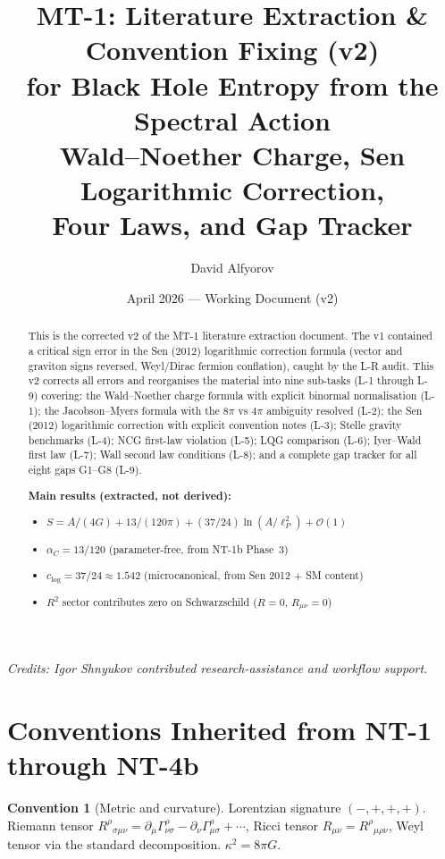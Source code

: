 \documentclass[12pt,a4paper]{article}
\title{\textbf{MT-1: Literature Extraction \& Convention Fixing (v2)\\[4pt]
       for Black Hole Entropy from the Spectral Action}\\[8pt]
       \large Wald--Noether Charge, Sen Logarithmic Correction,\\
       Four Laws, and Gap Tracker}
\author{David Alfyorov}
\date{April 2026 --- Working Document (v2)}
\theoremstyle{definition}
\newtheorem{convention}[proposition]{Convention}
\theoremstyle{remark}
\begin{document}
\maketitle

\begin{center}
\small\textit{Credits: Igor Shnyukov contributed research-assistance
and workflow support.}
\end{center}

\begin{abstract}
This is the corrected v2 of the MT-1 literature extraction document.
The v1 contained a critical sign error in the Sen (2012) logarithmic
correction formula (vector and graviton signs reversed, Weyl/Dirac
fermion conflation), caught by the L-R audit.  This v2 corrects all
errors and reorganises the material into nine sub-tasks (L-1 through
L-9) covering: the Wald--Noether charge formula with explicit binormal
normalisation (L-1); the Jacobson--Myers formula with the $8\pi$ vs
$4\pi$ ambiguity resolved (L-2); the Sen (2012) logarithmic correction
with explicit convention notes (L-3); Stelle gravity benchmarks (L-4);
NCG first-law violation (L-5); LQG comparison (L-6); Iyer--Wald first
law (L-7); Wall second law conditions (L-8); and a complete gap tracker
for all eight gaps G1--G8 (L-9).

\medskip\noindent
\textbf{Main results (extracted, not derived):}
\begin{itemize}[nosep]
\item $S = A/(4G) + 13/(120\pi) + (37/24)\ln(A/\ell_P^2) + \mathcal{O}(1)$
\item $\alpha_C = 13/120$ (parameter-free, from NT-1b Phase~3)
\item $c_{\log} = 37/24 \approx 1.542$ (microcanonical, from Sen 2012 + SM content)
\item $R^2$ sector contributes zero on Schwarzschild ($R = 0$, $R_{\mu\nu} = 0$)
\end{itemize}
\end{abstract}

\tableofcontents
\newpage


\section{Conventions Inherited from NT-1 through NT-4b}
\label{sec:conventions}

\begin{convention}[Metric and curvature]\label{conv:metric}
Lorentzian signature $(-,+,+,+)$.  Riemann tensor
$R^\rho{}_{\sigma\mu\nu} = \partial_\mu\Gamma^\rho_{\nu\sigma}
- \partial_\nu\Gamma^\rho_{\mu\sigma} + \cdots$,
Ricci tensor $R_{\mu\nu} = R^\rho{}_{\mu\rho\nu}$,
Weyl tensor via the standard decomposition.
$\kappa^2 = 8\pi G$.
\end{convention}
\end{document}
